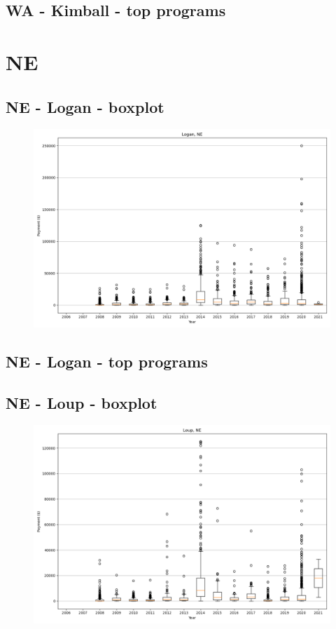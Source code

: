 \subsection*{WA - Kimball - top programs}

\newpage
\section*{NE}
\subsection*{NE - Logan - boxplot}
\begin{figure}[h]
\centering
\includegraphics[width=7in]{../output/boxplots/counties/Logan-NE_boxplot.png}
\end{figure}


\subsection*{NE - Logan - top programs}

\newpage
\subsection*{NE - Loup - boxplot}
\begin{figure}[h]
\centering
\includegraphics[width=7in]{../output/boxplots/counties/Loup-NE_boxplot.png}
\end{figure}


